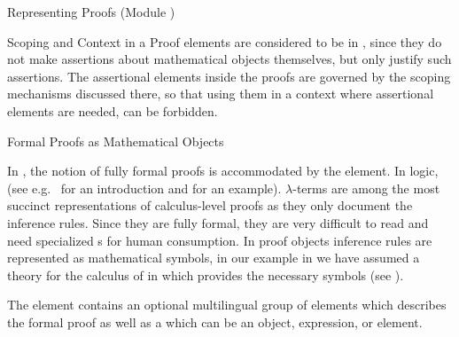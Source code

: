 \begin{omgroup}[id=proofs,short=Representing Proofs]{Representing Proofs (Module {})}
\begin{module}[id=scoping-proofs]
\begin{omgroup}[id=proofs.scoping]{Scoping and Context in a Proof}
 elements are considered to be
 in \omdoc, since they do not make
assertions about mathematical objects themselves, but only justify such assertions.
The assertional elements inside the proofs are governed by the scoping mechanisms
discussed there, so that using them in a context where assertional elements are
needed, can be forbidden. 
\end{omgroup}
\end{module}

\begin{module}[id=proofobjects]
\begin{omgroup}[id=proofobjects]{Formal Proofs as Mathematical Objects}

\begin{omtext}
  In \omdoc, the notion of fully formal proofs is accommodated by the
   element. In logic,  (see e.g.~\cite{Thompson91} for an introduction and
  {} for an example).  $\lambda$-terms are among the most succinct
  representations of calculus-level proofs as they only document the inference
  rules. Since they are fully formal, they are very difficult to read and need specialized
  {s} for human consumption. In proof objects
  inference rules are represented as mathematical symbols, in our example in
  {} we have assumed a theory {} for the calculus of
  {} in {} which provides the
  necessary symbols (see {}).
\end{omtext}

\begin{definition}[id=proofobject.def]
  The {} element contains an optional multilingual group of
   elements which describes the formal proof as well as a
  {} which can be an {\openmath} object, {\cmathml} expression, or
   element.
\end{definition}


\end{omgroup}
\end{module}
\end{omgroup}
